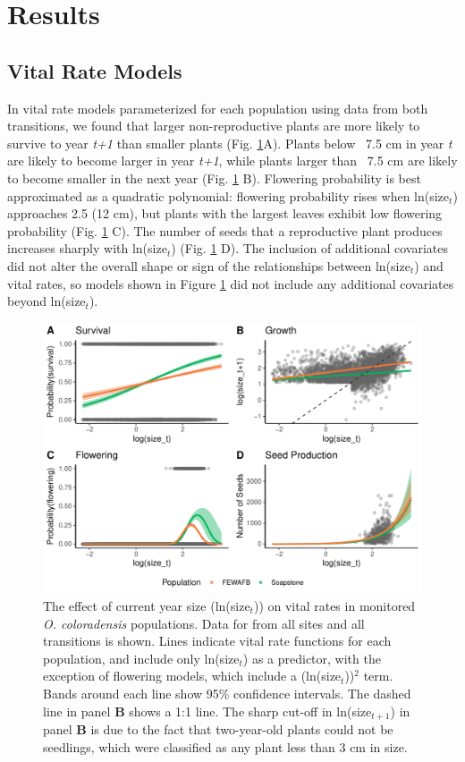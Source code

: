 \documentclass[12pt, letterpaper]{article}
\begin{document}
\section{Results}

\subsection{Vital Rate Models} 

In vital rate models parameterized for each population using data from both transitions, we found that larger non-reproductive plants are more likely to survive to year \textit{t+1} than smaller plants (Fig. \ref{fig:vitalRates}A). Plants below ~7.5 cm in year \textit{t} are likely to become larger in year \textit{t+1}, while plants larger than ~7.5 cm are likely to become smaller in the next year (Fig. \ref{fig:vitalRates} B). Flowering probability is best approximated as a quadratic polynomial: flowering probability rises when ln(size$_t$) approaches 2.5 (12 cm), but plants with the largest leaves exhibit low flowering probability (Fig. \ref{fig:vitalRates} C). The number of seeds that a reproductive plant produces increases sharply with ln(size$_t$) (Fig. \ref{fig:vitalRates} D). The inclusion of additional covariates did not alter the overall shape or sign of the relationships between ln(size$_t$) and vital rates, so models shown in Figure \ref{fig:vitalRates} did not include any additional covariates beyond ln(size$_t$).  

\begin{figure}[h]
  \centering
  \includegraphics[width=\textwidth]{figures/vitalRateModelFit.pdf}
  \caption{The effect of current year size (ln(size$_t$)) on vital rates in monitored \textit{O. coloradensis} populations. Data for from all sites and all transitions is shown. Lines indicate vital rate functions for each population, and include only ln(size$_t$) as a predictor, with the exception of flowering models, which include a (ln(size$_t$))$^2$ term. Bands around each line show 95\% confidence intervals. The dashed line in panel \textbf{B} shows a 1:1 line. The sharp cut-off in ln(size$_{t+1}$) in panel \textbf{B} is due to the fact that two-year-old plants could not be seedlings, which were classified as any plant less than 3 cm in size.}
  \label{fig:vitalRates}
\end{figure} 
\end{document}
